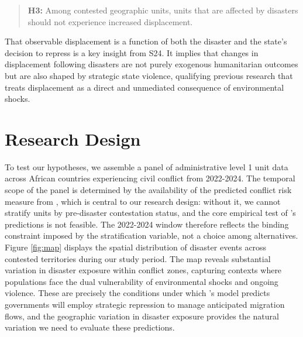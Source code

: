 \documentclass[bibtex]{article}
\begin{document}
\begin{quote}
\textbf{H3:} Among contested geographic units, units that are affected by disasters should not experience increased displacement.
\end{quote}

That observable displacement is a function of both the disaster and the state's decision to repress is a key insight from S24. It implies that changes in displacement following disasters are not purely exogenous humanitarian outcomes but are also shaped by strategic state violence, qualifying previous research that treats displacement as a direct and unmediated consequence of environmental shocks.



\section*{Research Design} 

To test our hypotheses, we assemble a panel of administrative level 1 unit data across African countries experiencing civil conflict from 2022-2024. The temporal scope of the panel is determined by the availability of the predicted conflict risk measure from \citet{mueller_rauh2022}, which is central to our research design: without it, we cannot stratify units by pre-disaster contestation status, and the core empirical test of \citeauthor{sun2024strategic}'s \citeyearpar{sun2024strategic}  predictions is not feasible. The 2022-2024 window therefore reflects the binding constraint imposed by the stratification variable, not a choice among alternatives. Figure \ref{fig:map} displays the spatial distribution of disaster events across contested territories during our study period. The map reveals substantial variation in disaster exposure within conflict zones, capturing contexts where populations face the dual vulnerability of environmental shocks and ongoing violence. These are precisely the conditions under which \citeauthor{sun2024strategic}'s \citeyearpar{sun2024strategic} model predicts governments will employ strategic repression to manage anticipated migration flows, and the geographic variation in disaster exposure provides the natural variation we need to evaluate these predictions.
\end{document}
